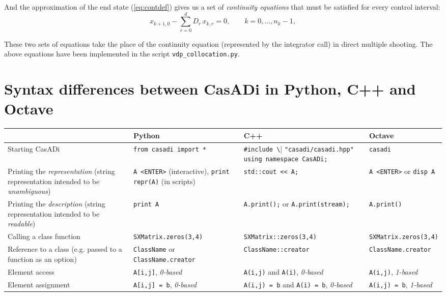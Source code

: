 \documentclass[a4paper,12pt]{book}
\begin{document}
{And the approximation of the end state (\ref{eq:contdef}) gives us a set of \emph{continuity equations} that must be satisfied for every control interval:
\begin{equation}
x_{k+1,0} - \sum_{r=0}^{d}{D_r \, x_{k,r}} = 0, \qquad k=0,\ldots,n_k-1, 
\end{equation}

These two sets of equations take the place of the continuity equation (represented by the integrator call) in direct multiple shooting. The above equations have been implemented in the script \texttt{vdp\_collocation.py}.

\chapter{Syntax differences between CasADi in Python, C++ and Octave}\label{sec:syntax_differences}
\scriptsize
\begin{center}
  \begin{tabular}{| p{3.5cm} | p{3.5cm} | p{3.5cm} | p{3.5cm} | }
    \hline
      & Python & C++ & Octave \\ \hline
    Starting CasADi & \verb|from casadi import *| & \verb|#include \| \verb|"casadi/casadi.hpp"| \verb|using namespace CasADi;| & \verb|casadi| \\ \hline
    Printing the \emph{representation} (string representation intended to be \emph{unambiguous}) & \verb|A <ENTER>| (interactive), \verb|print repr(A)| (in scripts) & \verb|std::cout << A;|& \verb|A <ENTER>| or \verb|disp A|\\ \hline
    Printing the \emph{description} (string representation intended to be \emph{readable}) & \verb|print A| & \verb|A.print();| or \verb|A.print(stream);|& \verb|A.print()| \\ \hline
    Calling a class function & \verb|SXMatrix.zeros(3,4)| & \verb|SXMatrix::zeros(3,4)| & \verb|SXMatrix.zeros(3,4)|\\ \hline
    Reference to a class (e.g. passed to a function as an option) & \verb|ClassName| or \verb|ClassName.creator| & \verb|ClassName::creator| & \verb|ClassName.creator|\\ \hline
    Element access & \verb|A[i,j]|, \emph{0-based} & \verb|A(i,j)| and \verb|A(i)|, \emph{0-based} & \verb|A(i,j)|, \emph{1-based} \\ \hline
    Element assignment & \verb|A[i,j] = b|, \emph{0-based} & \verb|A(i,j) = b| and \verb|A(i) = b|, \linebreak \emph{0-based} & \verb|A(i,j) = b|, \emph{1-based} \\ \hline

\end{tabular}
\end{center}}
\end{document}
